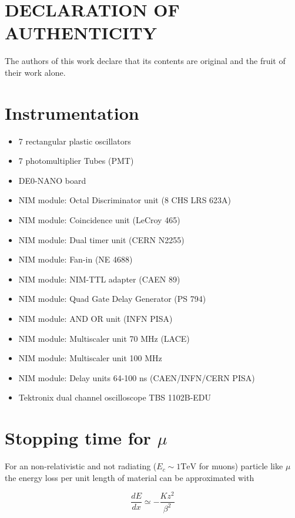 \documentclass[10pt,a4paper,twocolumn]{article}
\begin{document}
\section*{DECLARATION OF AUTHENTICITY}
The authors of this work declare that its contents are original and the fruit of their work alone.

\clearpage
\begin{appendices}


\section{Instrumentation}\label{appendix:nimmodules}

\begin{itemize}
\item 7 rectangular plastic oscillators
\item 7 photomultiplier Tubes (PMT) 
\item DE0-NANO board
\item NIM module: Octal Discriminator unit (8 CHS LRS 623A)
\item NIM module: Coincidence unit (LeCroy 465)
\item NIM module: Dual timer unit (CERN N2255)
\item NIM module: Fan-in (NE 4688)
\item NIM module: NIM-TTL adapter (CAEN 89)
\item NIM module: Quad Gate Delay Generator (PS 794)
\item NIM module: AND OR unit (INFN PISA)
\item NIM module: Multiscaler unit 70 MHz (LACE)
\item NIM module: Multiscaler unit 100 MHz
\item NIM module: Delay units  64-100 ns (CAEN/INFN/CERN PISA)
\item Tektronix dual channel oscilloscope TBS 1102B-EDU
        
 \end{itemize}
 
 
\section{Stopping time for $\mu$}\label{appendix:stoptime}
For an non-relativistic and not radiating ($E_c \sim 1 \text{TeV}$ for muons) particle like $\mu$ the energy loss per unit length of material can be approximated with


\begin{equation}
    \frac{dE}{dx}\simeq-\frac{Kz^2}{\beta^2}
\end{equation}


\end{appendices}
\end{document}
